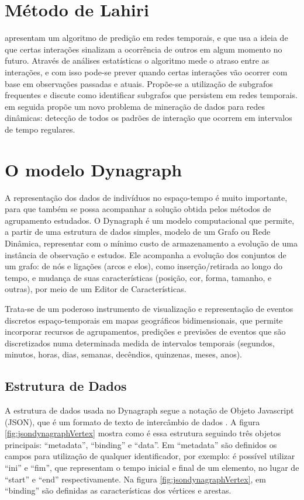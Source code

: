 \section{Método de Lahiri}
\label{lahiri}
 apresentam um algoritmo de predição em redes temporais, e que usa a ideia de que certas interações sinalizam a ocorrência de outros em algum momento no futuro. Através de análises estatísticas o algoritmo mede o atraso entre as interações, e com isso pode-se prever quando certas interações vão ocorrer com base em observações passadas e atuais. Propõe-se a utilização de subgrafos frequentes e discute como identificar subgrafos que persistem em redes temporais.
 em seguida propõe um novo problema de mineração de dados para redes dinâmicas: detecção de todos os padrões de interação que ocorrem em intervalos de tempo regulares.

\section{O modelo Dynagraph}

A representação dos dados de indivíduos no espaço-tempo é muito importante, para que também se possa acompanhar a solução obtida pelos métodos de agrupamento estudados. O Dynagraph \cite{dynagraph} é um modelo computacional que permite, a partir de uma estrutura de dados simples, modelo de um Grafo ou Rede Dinâmica, representar com o mínimo custo de armazenamento a evolução de uma instância de observação e estudos. Ele acompanha a evolução dos conjuntos de um grafo: de nós e ligações (arcos e elos), como inserção/retirada ao longo do tempo, e mudança de suas características (posição, cor, forma, tamanho, e outras), por meio de um Editor de Características.

Trata-se de um poderoso instrumento de visualização e representação de eventos discretos espaço-temporais em mapas geográficos bidimensionais, que permite incorporar recursos de agrupamentos, predições e previsões de eventos que são discretizados numa determinada medida de intervalos temporais (segundos, minutos, horas, dias, semanas, decêndios, quinzenas, meses, anos).

\subsection{Estrutura de Dados}

A estrutura de dados usada no Dynagraph segue a notação de Objeto Javascript (\acrfull{JSON}), que é um formato de texto de intercâmbio de dados \cite{douglas}. A figura \ref{fig:jsondynagraphVertex} mostra como é essa estrutura seguindo três objetos principais: ``metadata'', ``binding'' e ``data''.
Em ``metadata'' são definidos os campos para utilização de qualquer identificador, por exemplo: é possível utilizar ``ini'' e ``fim'',
que representam o tempo inicial e final de um elemento, no lugar de ``start'' e ``end'' respectivamente.
Na figura \ref{fig:jsondynagraphVertex}, em ``binding'' são definidas as características dos vértices e arestas.

